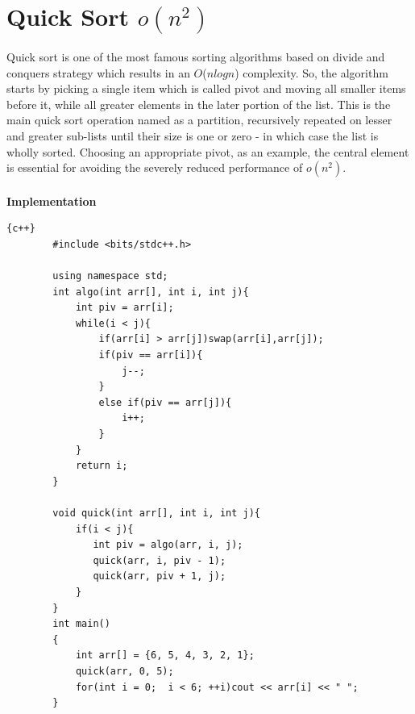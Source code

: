 \newpage

\section{Quick Sort $o(n^2)$}

Quick sort is one of the most famous sorting algorithms based on divide and conquers strategy which results in an $O$($n$$log$$n$) complexity. So, the algorithm starts by picking a single item which is called pivot and moving all smaller items before it, while all greater elements in the later portion of the list. This is the main quick sort operation named as a partition, recursively repeated on lesser and greater sub-lists until their size is one or zero - in which case the list is wholly sorted. Choosing an appropriate pivot, as an example, the central element is essential for avoiding the severely reduced performance of $o(n^2)$.
\\
\\
\newline\newline
\textbf{{\Large{Implementation}}}
\begin{lstlisting}{c++}
        #include <bits/stdc++.h>
        
        using namespace std;
        int algo(int arr[], int i, int j){
            int piv = arr[i];
            while(i < j){
                if(arr[i] > arr[j])swap(arr[i],arr[j]);
                if(piv == arr[i]){
                    j--;
                }
                else if(piv == arr[j]){
                    i++;
                }
            }
            return i;
        }
        
        void quick(int arr[], int i, int j){
            if(i < j){
               int piv = algo(arr, i, j);
               quick(arr, i, piv - 1);
               quick(arr, piv + 1, j);
            }
        }
        int main()
        {
            int arr[] = {6, 5, 4, 3, 2, 1};
            quick(arr, 0, 5);
            for(int i = 0;  i < 6; ++i)cout << arr[i] << " ";
        }

\end{lstlisting}
